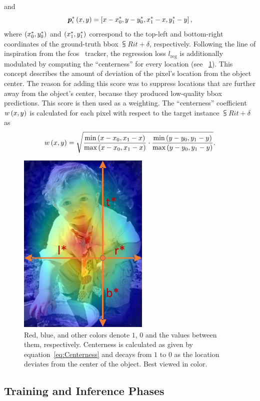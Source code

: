 and
\begin{equation}
    {\bm{p}_{i}^{*}} \left( x, y \right) =
    \left[ {
        x - {x}_{0}^{*},
        y - {y}_{0}^{*},
        {x}_{1}^{*} - x,
        {y}_{1}^{*} - y
    } \right],
\end{equation}
where $\left( {{x}_{0}^{*}, {y}_{0}^{*}} \right)$ and $\left( {{x}_{1}^{*}, {y}_{1}^{*}} \right)$ correspond to the top-left and bottom-right coordinates of the ground-truth \gls{bbox} $\subsup{R}{i}{t + \delta}$, respectively. Following the line of inspiration from the \gls{fcos}~\cite{tian2019fcos} tracker, the regression loss $l_{\text{reg}}$ is additionally modulated by computing the ``centerness'' for every location (see \figstr{}~\ref{fig:FCOSCenterness}). This concept describes the amount of deviation of the pixel's location from the object center. The reason for adding this score was to suppress locations that are further away from the object's center, because they produced low-quality \gls{bbox} predictions. This score is then used as a weighting. The ``centerness'' coefficient ${w} \left( x, y \right)$ is calculated for each pixel with respect to the target instance $\subsup{R}{i}{t + \delta}$ as
\begin{equation}
    \label{eq:Centerness}
    {w} \left( x, y \right) =
    \sqrt{
        \frac{\text{min} \left( x - x_0, x_1 - x \right)}{\text{max} \left( x - x_0, x_1 - x \right)}
        \cdot
        \frac{\text{min} \left( y - y_0, y_1 - y \right)}{\text{max} \left( y - y_0, y_1 - y \right)}
    }.
\end{equation}

\begin{figure}[t]
    \centerline{\includegraphics[width=0.2\linewidth]{figures/methodology/fcos_centerness.pdf}}
    \caption[Centerness visualization]{Red, blue, and other colors denote $1$, $0$ and the values between them, respectively. Centerness is calculated as given by equation~\ref{eq:Centerness} and decays from $1$ to $0$ as the location deviates from the center of the object. Best viewed in color. }
    \label{fig:FCOSCenterness}
\end{figure}

\subsection{Training and Inference Phases}

